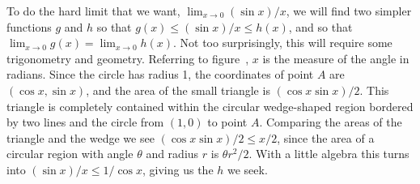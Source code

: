 
To do the hard limit that we want, $\lim_{x\to0}
(\sin x)/x$, we will find two simpler functions $g$ and $h$ so that 
$g(x)\le (\sin x)/x\le h(x)$, and so that
$\lim_{x\to0}g(x)=\lim_{x\to0}h(x)$. Not too surprisingly, this will
require some trigonometry and geometry. Referring to
figure~, $x$ is the measure of the angle in
radians. Since the circle has radius 1, the coordinates of point $A$
are $(\cos x,\sin x)$, and the area of the small triangle is 
$(\cos x\sin x)/2$. This triangle is completely contained within the
circular wedge-shaped region bordered by two lines and the circle from
$(1,0)$ to point $A$. Comparing the areas of the triangle and the
wedge we see
$(\cos x\sin x)/2 \le x/2$, since the area of a circular region with
angle $\theta$ and radius $r$ is $\theta r^2/2$. With a little algebra
this turns into $(\sin x)/x \le 1/\cos x$, giving us the $h$ we seek.

